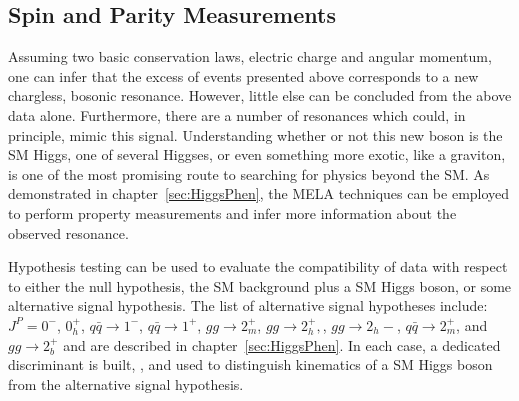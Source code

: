 \subsection{Spin and Parity Measurements}
\label{sec:HZZ4lspinParity}

Assuming two basic conservation laws, electric charge and angular
momentum, one can infer that the excess of events presented 
above corresponds to a 
new chargless, bosonic resonance.  However, little else can be
concluded from the above data alone.  Furthermore, there are a
number of resonances which could, in principle, mimic this 
signal.  
Understanding whether or not this new boson is the SM Higgs, 
one of several Higgses, or even something more exotic, like 
a graviton, is one of the most promising route to searching
for physics beyond the SM.  As demonstrated in 
chapter~\ref{sec:HiggsPhen}, the MELA techniques can be employed
to perform property measurements and infer more information 
about the observed resonance. 

Hypothesis testing can be used to evaluate the compatibility 
of data with respect to either the null hypothesis, the SM
background plus a SM Higgs boson, or some alternative signal
hypothesis.  The list of alternative signal hypotheses include:
$J^P=0^-$, $0^+_h$, $q\bar{q}\to1^-$, $q\bar{q}\to1^+$, 
$gg\to2_m^+$, $gg\to2_h^+,$, $gg\to2_h-$, $q\bar{q}\to2_m^+$, 
and $gg\to2_b^+$ and are described in chapter~\ref{sec:HiggsPhen}.  
In each case, a dedicated discriminant is built, 
\spinKD, and used to distinguish kinematics of a SM Higgs boson 
from the alternative signal hypothesis.  


